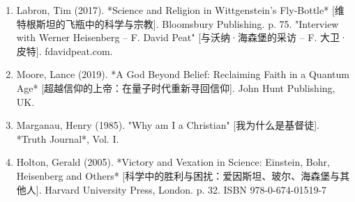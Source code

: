 \begin{enumerate}
\item Labron, Tim (2017). *Science and Religion in Wittgenstein's Fly-Bottle* [维特根斯坦的飞瓶中的科学与宗教]. Bloomsbury Publishing. p. 75.  
"Interview with Werner Heisenberg – F. David Peat" [与沃纳·海森堡的采访 – F. 大卫·皮特]. fdavidpeat.com.  
\item Moore, Lance (2019). *A God Beyond Belief: Reclaiming Faith in a Quantum Age* [超越信仰的上帝：在量子时代重新寻回信仰]. John Hunt Publishing, UK.  
\item Marganau, Henry (1985). "Why am I a Christian" [我为什么是基督徒]. *Truth Journal*, Vol. I.  
\item Holton, Gerald (2005). *Victory and Vexation in Science: Einstein, Bohr, Heisenberg and Others* [科学中的胜利与困扰：爱因斯坦、玻尔、海森堡与其他人]. Harvard University Press, London. p. 32. ISBN 978-0-674-01519-7
\end{enumerate}